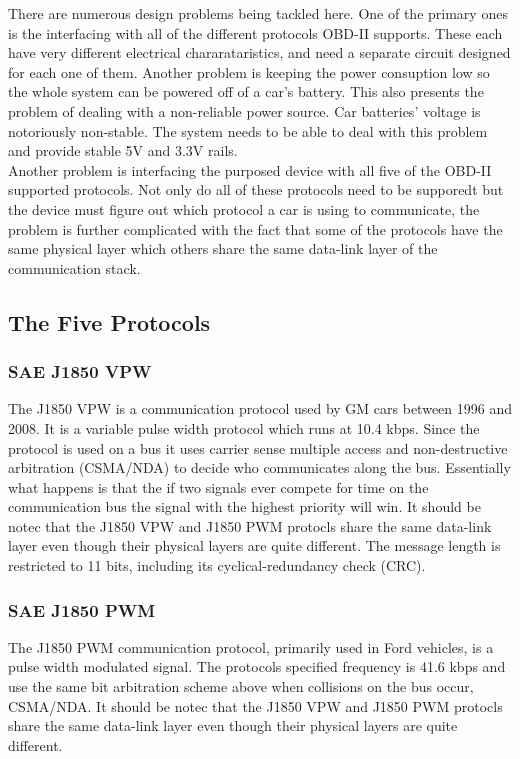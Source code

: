 \documentclass[12pt,letterpaper]{article}
\begin{document}
There are numerous design problems being tackled here. One of the primary ones is the interfacing with all of the different protocols OBD-II supports. These each have very different electrical chararataristics, and need a separate circuit designed for each one of them. Another problem is keeping the power consuption low so the whole system can be powered off of a car's battery. This also presents the problem of dealing with a non-reliable power source. Car batteries' voltage is notoriously non-stable. The system needs to be able to deal with this problem and provide stable 5V and 3.3V rails. \\

Another problem is interfacing the purposed device with all five of the OBD-II supported protocols. Not only do all of these protocols need to be supporedt but the device must figure out which protocol a car is using to communicate, the problem is further complicated with the fact that some of the protocols have the same physical layer which others share the same data-link layer of the communication stack. 

\subsection{The Five Protocols}
\subsubsection{SAE J1850 VPW}
The J1850 VPW is a communication protocol used by GM cars between 1996 and 2008. It is a variable pulse width protocol which runs at 10.4 kbps. Since the protocol is used on a bus it uses carrier sense multiple access and non-destructive arbitration (CSMA/NDA) to decide who communicates along the bus. Essentially what happens is that the if two signals ever compete for time on the communication bus the signal with the highest priority will win. It should be notec that the J1850 VPW and J1850 PWM protocls share the same data-link layer even though their physical layers are quite different. The message length is restricted to 11 bits, including its cyclical-redundancy check (CRC).
 
\subsubsection{SAE J1850 PWM}
The J1850 PWM communication protocol, primarily used in Ford vehicles, is a pulse width modulated signal. The protocols specified frequency is 41.6 kbps and use the same bit arbitration scheme above when collisions on the bus occur, CSMA/NDA. It should be notec that the J1850 VPW and J1850 PWM protocls share the same data-link layer even though their physical layers are quite different.
\end{document}
